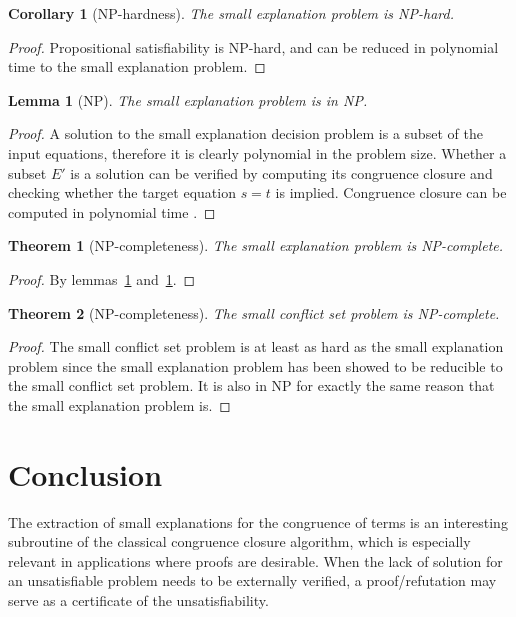 \documentclass{easychair}
\newtheorem{corollary}{Corollary}
\newtheorem{theorem}{Theorem}
\newtheorem{lemma}{Lemma}
\begin{document}
\begin{corollary}[NP-hardness]
\label{lemma:nphardness}
The small explanation problem is NP-hard.
\end{corollary}
\begin{proof}
Propositional satisfiability is NP-hard, and can be reduced in polynomial time
to the small explanation problem.
\end{proof}

\begin{lemma}[NP]
\label{lemma:innp}
The small explanation problem is in NP.
\end{lemma}
\begin{proof}
A solution to the small explanation decision problem is a subset of the input
equations, therefore it is clearly polynomial in the problem size.  Whether
a subset $E'$ is a solution can be verified by computing its congruence closure
and checking whether the target equation $s = t$ is implied. Congruence closure can be computed in polynomial time
\cite{Nelson2,Downey1,Nieuwenhuis6}.
\end{proof}


\begin{theorem}[NP-completeness]
The small explanation problem is NP-complete.
\end{theorem}
\begin{proof}
By lemmas~\ref{lemma:nphardness} and~\ref{lemma:innp}.
\end{proof}

\begin{theorem}[NP-completeness]
The small conflict set problem is NP-complete.
\end{theorem}
\begin{proof}
The small conflict set problem is at least as hard as the small explanation problem since the small explanation problem has been showed to be reducible to the small conflict set problem.  It is also in NP for exactly the same reason that the small explanation problem is.
\end{proof}


\section*{Conclusion}

The extraction of small explanations for the congruence of terms is an interesting subroutine of the classical congruence closure algorithm, which is especially relevant in applications where proofs are desirable. When the lack of solution for an unsatisfiable problem needs to be externally verified, a proof/refutation may serve as a certificate of the unsatisfiability.
\end{document}
